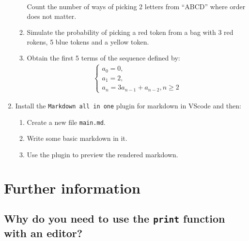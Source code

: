 \begin{enumerate}
\begin{enumerate}
Count the number of ways of picking 2 letters from “ABCD” where order
does not matter.

\item 

Simulate the probability of picking a red token from a bag with 3 red
rokens, 5 blue tokens and a yellow token.

\item 

Obtain the first 5 terms of the sequence defined by:
\begin{equation*}
\begin{split}
        \left\{
            \begin{array}{l}
              a_0 = 0,\\
              a_1 = 2,\\
              a_n = 3 a_{n - 1} + a_{n - 2}, n \geq 2
            \end{array}
        \right.
      \end{split}
\end{equation*}
\end{enumerate}

\item 

Install the \texttt{Markdown all in one} plugin for markdown in VScode and then:
\begin{enumerate}

\item 

Create a new file \texttt{main.md}.

\item 

Write some basic markdown in it.

\item 

Use the plugin to preview the rendered markdown.

\end{enumerate}

\end{enumerate}




\section{Further information}
\label{\detokenize{building-tools/04-editor-and-cli/why/main:further-information}}\label{\detokenize{building-tools/04-editor-and-cli/why/main::doc}}

\subsection{Why do you need to use the \texttt{print} function with an editor?}
\label{\detokenize{building-tools/04-editor-and-cli/why/main:why-do-we-need-to-use-the-print-function-with-an-editor}}

